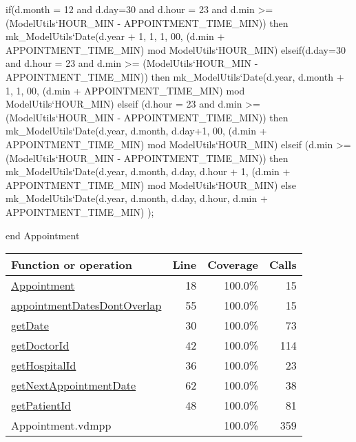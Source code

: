 \begin{vdmpp}[breaklines=true]
  if(d.month = 12 and d.day=30 and d.hour = 23 and d.min >= (ModelUtils`HOUR_MIN - APPOINTMENT_TIME_MIN)) then
   mk_ModelUtils`Date(d.year + 1, 1, 1, 00, (d.min + APPOINTMENT_TIME_MIN) mod ModelUtils`HOUR_MIN)
  elseif(d.day=30 and d.hour = 23 and d.min >= (ModelUtils`HOUR_MIN - APPOINTMENT_TIME_MIN)) then
   mk_ModelUtils`Date(d.year, d.month + 1, 1, 00, (d.min + APPOINTMENT_TIME_MIN) mod ModelUtils`HOUR_MIN)
  elseif (d.hour = 23 and d.min >= (ModelUtils`HOUR_MIN - APPOINTMENT_TIME_MIN)) then
   mk_ModelUtils`Date(d.year, d.month, d.day+1, 00, (d.min + APPOINTMENT_TIME_MIN) mod ModelUtils`HOUR_MIN)
  elseif (d.min >= (ModelUtils`HOUR_MIN - APPOINTMENT_TIME_MIN)) then
   mk_ModelUtils`Date(d.year, d.month, d.day, d.hour + 1, (d.min + APPOINTMENT_TIME_MIN) mod ModelUtils`HOUR_MIN)
  else
   mk_ModelUtils`Date(d.year, d.month, d.day, d.hour, d.min + APPOINTMENT_TIME_MIN)
 );
 
 
end Appointment
\end{vdmpp}
\bigskip
\begin{longtable}{|l|r|r|r|}
\hline
Function or operation & Line & Coverage & Calls \\
\hline
\hline
\hyperref[Appointment:18]{Appointment} & 18&100.0\% & 15 \\
\hline
\hyperref[appointmentDatesDontOverlap:55]{appointmentDatesDontOverlap} & 55&100.0\% & 15 \\
\hline
\hyperref[getDate:30]{getDate} & 30&100.0\% & 73 \\
\hline
\hyperref[getDoctorId:42]{getDoctorId} & 42&100.0\% & 114 \\
\hline
\hyperref[getHospitalId:36]{getHospitalId} & 36&100.0\% & 23 \\
\hline
\hyperref[getNextAppointmentDate:62]{getNextAppointmentDate} & 62&100.0\% & 38 \\
\hline
\hyperref[getPatientId:48]{getPatientId} & 48&100.0\% & 81 \\
\hline
\hline
Appointment.vdmpp & & 100.0\% & 359 \\
\hline
\end{longtable}

